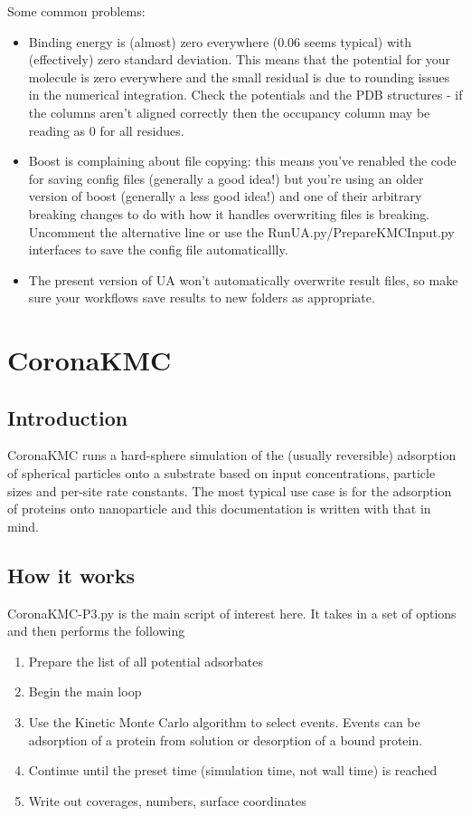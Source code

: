 \documentclass[10pt,a4paper,onecolumn]{report}
\begin{document}
Some common problems:
\begin{itemize}
\item Binding energy is (almost) zero everywhere (0.06 seems typical) with (effectively) zero standard deviation. This means that the potential for your molecule is zero everywhere and the small residual is due to rounding issues in the numerical integration. Check the potentials and the PDB structures - if the columns aren't aligned correctly then the occupancy column may be reading as 0 for all residues.
\item Boost is complaining about file copying: this means you've renabled the code for saving config files (generally a good idea!) but you're using an older version of boost (generally a less good idea!) and one of their arbitrary breaking changes to do with how it handles overwriting files is breaking. Uncomment the alternative line or use the RunUA.py/PrepareKMCInput.py interfaces to save the config file automaticallly. 
\item The present version of UA won't automatically overwrite result files, so make sure your workflows save results to new folders as appropriate.
\end{itemize}


\chapter{CoronaKMC}
 \section{Introduction}
 CoronaKMC runs a hard-sphere simulation of the (usually reversible) adsorption of spherical particles onto a substrate based on input concentrations, particle sizes and per-site rate constants. The most typical use case is for the adsorption of proteins onto nanoparticle and this documentation is written with that in mind. 
 
 \section{How it works}
CoronaKMC-P3.py is the main script of interest here. It takes in a set of options and then performs the following
\begin{enumerate}
\item Prepare the list of all potential adsorbates
\item Begin the main loop
\item Use the Kinetic Monte Carlo algorithm to select events. Events can be adsorption of a protein from solution or desorption of a bound protein.
\item Continue until the preset time (simulation time, not wall time) is reached
\item Write out coverages, numbers, surface coordinates
\end{enumerate} 
 
\end{document}
